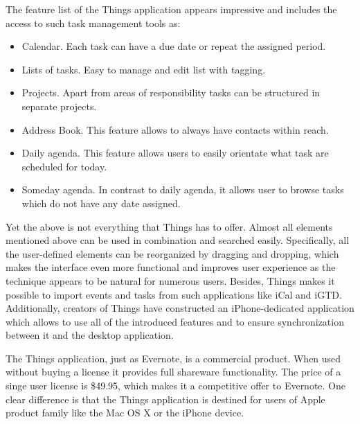 The feature list of the Things application appears impressive and includes the access to such task management tools as:
 \begin{itemize}
 \item{Calendar. Each task can have a due date or repeat the assigned period.}
 \item{Lists of tasks. Easy to manage and edit list with tagging.}
 \item{Projects. Apart from areas of responsibility tasks can be structured in separate projects.}
 \item{Address Book. This feature allows to always have contacts within reach.}
 \item{Daily agenda. This feature allows users to easily orientate what task are scheduled for today.}
 \item{Someday agenda. In contrast to daily agenda, it allows user to browse tasks which do not have any date assigned.}
 \end{itemize}
Yet the above is not everything that Things has to offer. Almost all elements mentioned above can be used in combination and searched easily. Specifically, all the user-defined elements can be reorganized by dragging and dropping, which makes the interface even more functional and improves user experience as the technique appears to be natural for numerous users. Besides, Things makes it possible to import events and tasks from such applications like iCal and iGTD. Additionally, creators of Things have constructed an iPhone-dedicated application which allows to use all of the introduced features and to ensure synchronization between it and the desktop application. 

The Things application, just as Evernote, is a commercial product. When used without buying a license it provides full shareware functionality. The price of a singe user license is \$49.95, which makes it a competitive offer to Evernote. One clear difference is that the Things application is destined for users of Apple product family like the Mac OS X or the iPhone device.
 
